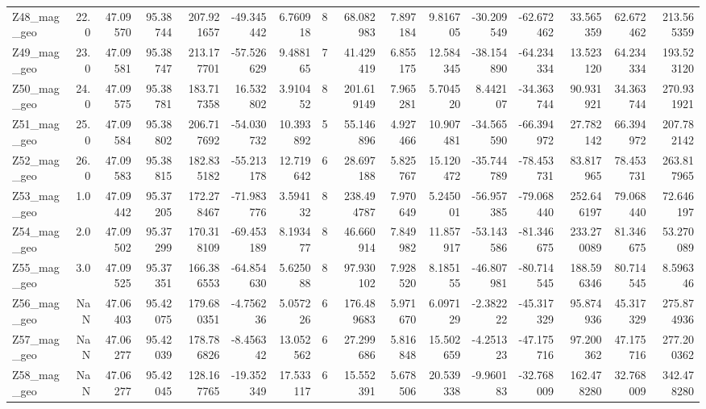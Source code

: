 \documentclass[11pt]{article}
\begin{document}
\begin{sidewaystable}
{\begin{tabular}{lrrrrrrrrrrrrrrr}
Z48\_mag\_geo &       22.0 &  47.09570 &  95.38744 &  207.921657 & -49.345442 &   6.760918 &   8 &   68.082983 &  7.897184 &   9.816705 &     -30.209549 & -62.672462 &   33.565359 &    62.672462 &   213.565359 \\
Z49\_mag\_geo &       23.0 &  47.09581 &  95.38747 &  213.177701 & -57.526629 &   9.488165 &   7 &   41.429419 &  6.855175 &  12.584345 &     -38.154890 & -64.234334 &   13.523120 &    64.234334 &   193.523120 \\
Z50\_mag\_geo &       24.0 &  47.09575 &  95.38781 &  183.717358 &  16.532802 &   3.910452 &   8 &  201.619149 &  7.965281 &   5.704520 &       8.442107 & -34.363744 &   90.931921 &    34.363744 &   270.931921 \\
Z51\_mag\_geo &       25.0 &  47.09584 &  95.38802 &  206.717692 & -54.030732 &  10.393892 &   5 &   55.146896 &  4.927466 &  10.907481 &     -34.565590 & -66.394972 &   27.782142 &    66.394972 &   207.782142 \\
Z52\_mag\_geo &       26.0 &  47.09583 &  95.38815 &  182.835182 & -55.213178 &  12.719642 &   6 &   28.697188 &  5.825767 &  15.120472 &     -35.744789 & -78.453731 &   83.817965 &    78.453731 &   263.817965 \\
Z53\_mag\_geo &        1.0 &  47.09442 &  95.37205 &  172.278467 & -71.983776 &   3.594132 &   8 &  238.494787 &  7.970649 &   5.245001 &     -56.957385 & -79.068440 &  252.646197 &    79.068440 &    72.646197 \\
Z54\_mag\_geo &        2.0 &  47.09502 &  95.37299 &  170.318109 & -69.453189 &   8.193477 &   8 &   46.660914 &  7.849982 &  11.857917 &     -53.143586 & -81.346675 &  233.270089 &    81.346675 &    53.270089 \\
Z55\_mag\_geo &        3.0 &  47.09525 &  95.37351 &  166.386553 & -64.854630 &   5.625088 &   8 &   97.930102 &  7.928520 &   8.185155 &     -46.807981 & -80.714545 &  188.596346 &    80.714545 &     8.596346 \\
Z56\_mag\_geo &        NaN &  47.06403 &  95.42075 &  179.680351 &  -4.756236 &   5.057226 &   6 &  176.489683 &  5.971670 &   6.097129 &      -2.382222 & -45.317329 &   95.874936 &    45.317329 &   275.874936 \\
Z57\_mag\_geo &        NaN &  47.06277 &  95.42039 &  178.786826 &  -8.456342 &  13.052562 &   6 &   27.299686 &  5.816848 &  15.502659 &      -4.251323 & -47.175716 &   97.200362 &    47.175716 &   277.200362 \\
Z58\_mag\_geo &        NaN &  47.06277 &  95.42045 &  128.167765 & -19.352349 &  17.533117 &   6 &   15.552391 &  5.678506 &  20.539338 &      -9.960183 & -32.768009 &  162.478280 &    32.768009 &   342.478280 \\
\bottomrule
\end{tabular}}
\end{sidewaystable}
    
\end{document}
